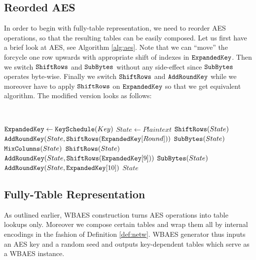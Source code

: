 
\subsection{Reorded AES}

In order to begin with fully-table representation, we need to reorder AES operations, so that the resulting tables can be easily composed. Let us first have a brief look at AES, see Algorithm \ref{alg:aes}. Note that we can ``move'' the forcycle one row upwards with appropriate shift of indexes in $\texttt{ExpandedKey}$. Then we switch $\texttt{ShiftRows}$ and $\texttt{SubBytes}$ without any side-effect since $\texttt{SubBytes}$ operates byte-wise. Finally we switch $\texttt{ShiftRows}$ and $\texttt{AddRoundKey}$ while we moreover have to apply $\texttt{ShiftRows}$ on $\texttt{ExpandedKey}$ so that we get equivalent algorithm. The modified version looks as follows:
\begin{alg}
\label{alg:reordaes}
	~
	\begin{algorithmic}[1]
			\State $\texttt{ExpandedKey} \gets \texttt{KeySchedule}(Key)$
			\State $State \gets Plaintext$
				\State $\texttt{ShiftRows}(State)$
				\State $\texttt{AddRoundKey}(State, \texttt{ShiftRows}(\texttt{ExpandedKey}[Round]))$
				\State $\texttt{SubBytes}(State)$
				\State $\texttt{MixColumns}(State)$
			\EndFor
			\State $\texttt{ShiftRows}(State)$
			\State $\texttt{AddRoundKey}(State, \texttt{ShiftRows}(\texttt{ExpandedKey}[9]))$
			\State $\texttt{SubBytes}(State)$
			\State $\texttt{AddRoundKey}(State, \texttt{ExpandedKey}[10])$
			\State\Return $State$
		\EndFunction
	\end{algorithmic}
\end{alg}



\subsection{Fully-Table Representation}

As outlined earlier, WBAES construction turns AES operations into table lookups only. Moreover we compose certain tables and wrap them all by internal encodings in the fashion of Definition \ref{def:netw}. WBAES generator thus inputs an AES key and a random seed and outputs key-dependent tables which serve as a WBAES instance.

